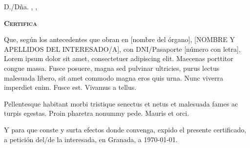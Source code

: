 \documentclass[noDatosCabecera, marcaagua, corporativo]{UGR-generico}
\begin{document}
\hfill\vfill
\begin{bfseries}
  D./Dña. \printNombre, \printCargo, \printDepartamento
\end{bfseries}
\bigskip

\begin{center}
  \bfseries\scshape\large
  Certifica
\end{center}
\bigskip

Que, según los antecedentes que obran en [nombre del órgano], [NOMBRE Y APELLIDOS DEL INTERESADO/A], con DNI/Pasaporte [número con letra], Lorem ipsum dolor sit amet, consectetuer adipiscing elit. Maecenas porttitor congue massa. Fusce posuere, magna sed pulvinar ultricies, purus lectus malesuada libero, sit amet commodo magna eros quis urna.
Nunc viverra imperdiet enim. Fusce est. Vivamus a tellus.

Pellentesque habitant morbi tristique senectus et netus et malesuada fames ac turpis egestas. Proin pharetra nonummy pede. Mauris et orci.

Y para que conste y surta efectos donde convenga, expido el presente certificado, a petición del/de la interesada, en Granada, a \today.

\vfill\vfill
\begin{center}


  \begin{bfseries}
    \printNombre\\
    \printCargo
  \end{bfseries}
\end{center}
\vfill


%
\end{document}
